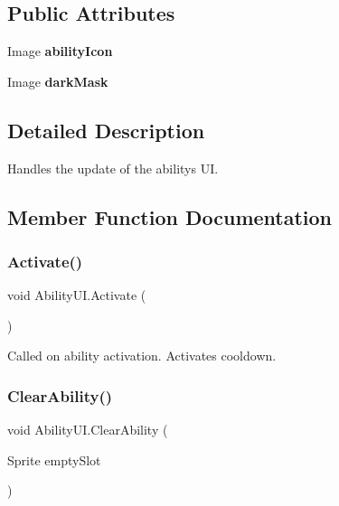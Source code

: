 \subsection*{Public Attributes}
\begin{DoxyCompactItemize}
\item 
\hypertarget{class_ability_u_i_ae8fec97370c2aa7bf4d64bc8c5100d6a}{}\label{class_ability_u_i_ae8fec97370c2aa7bf4d64bc8c5100d6a} 
Image {\bfseries ability\+Icon}
\item 
\hypertarget{class_ability_u_i_a563603df768e793fa98d605f71f9caea}{}\label{class_ability_u_i_a563603df768e793fa98d605f71f9caea} 
Image {\bfseries dark\+Mask}
\end{DoxyCompactItemize}


\subsection{Detailed Description}
Handles the update of the abilitys UI. 



\subsection{Member Function Documentation}
\hypertarget{class_ability_u_i_a710422c1bba0de889a758cffbc20659a}{}\label{class_ability_u_i_a710422c1bba0de889a758cffbc20659a} 
\subsubsection{\texorpdfstring{Activate()}{Activate()}}
{\footnotesize\ttfamily void Ability\+U\+I.\+Activate (\begin{DoxyParamCaption}{ }\end{DoxyParamCaption})}



Called on ability activation. Activates cooldown. 

\hypertarget{class_ability_u_i_aff8d54091c080f741980220b59277a30}{}\label{class_ability_u_i_aff8d54091c080f741980220b59277a30} 
\subsubsection{\texorpdfstring{Clear\+Ability()}{ClearAbility()}}
{\footnotesize\ttfamily void Ability\+U\+I.\+Clear\+Ability (\begin{DoxyParamCaption}\item[{Sprite}]{empty\+Slot }\end{DoxyParamCaption})}




